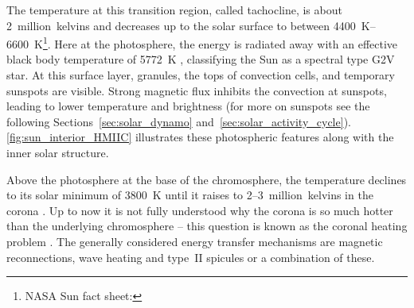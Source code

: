 The temperature at this transition region, called tachocline, is about 2~million~kelvins and decreases up to the solar surface to between \SIrange{4400}{6600}{\K}\footnote{NASA Sun fact sheet: }. Here at the photosphere, the energy is radiated away with an effective black body temperature of \SI{5772}{\K} \citep{Mamajek2015}, classifying the Sun as a spectral type G2V star.
At this surface layer, granules, the tops of convection cells, and temporary sunspots are visible. Strong magnetic flux inhibits the convection at sunspots, leading to lower temperature and brightness (for more on sunspots see the following Sections~\ref{sec:solar_dynamo} and~\ref{sec:solar_activity_cycle}). \autoref{fig:sun_interior_HMIIC} illustrates these photospheric features along with the inner solar structure.
\begin{figure}[htb]
\end{figure}

Above the photosphere at the base of the chromosphere, the temperature declines to its solar minimum of \SI{3800}{\K} until it raises to \numrange{2}{3}~million~kelvins in the corona \citep{Billings1959,Liebenberg1975}. Up to now it is not fully understood why the corona is so much hotter than the underlying chromosphere -- this question is known as the coronal heating problem \citep{Klimchuk2006,McComas2007,Fox2015}. The generally considered energy transfer mechanisms are magnetic reconnections, wave heating and type~II spicules or a combination of these.

